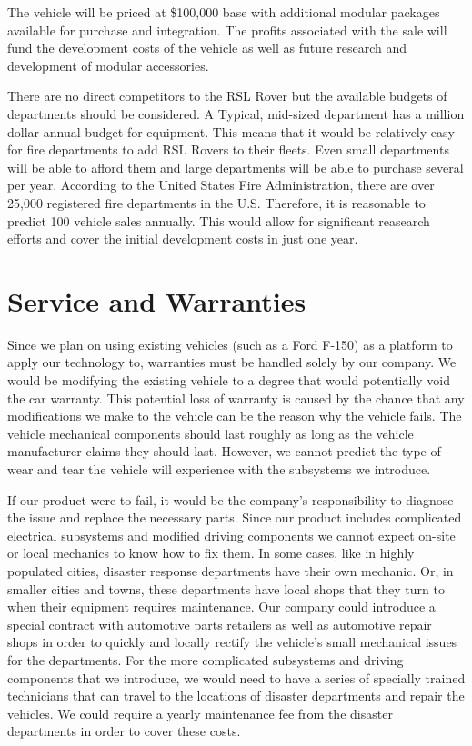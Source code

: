 The vehicle will be priced at \$100,000 base with additional modular packages available for purchase and integration. The profits associated with the sale will fund the development costs of the vehicle as well as future research and development of modular accessories.

There are no direct competitors to the RSL Rover but the available budgets of departments should be considered. A Typical, mid-sized department has a million dollar annual budget for equipment. This means that it would be relatively easy for fire departments to add RSL Rovers to their fleets. Even small departments will be able to afford them and large departments will be able to purchase several per year. According to the United States Fire Administration, there are over 25,000 registered fire departments in the U.S. Therefore, it is reasonable to predict 100 vehicle sales annually. This would allow for significant reasearch efforts and cover the initial development costs in just one year.

\section{Service and Warranties}

Since we plan on using existing vehicles (such as a Ford F-150) as a platform to apply our technology to, warranties must be handled solely by our company. We would be modifying the existing vehicle to a degree that would potentially void the car warranty. This potential loss of warranty is caused by the chance that any modifications we make to the vehicle can be the reason why the vehicle fails. The vehicle mechanical components should last roughly as long as the vehicle manufacturer claims they should last. However, we cannot predict the type of wear and tear the vehicle will experience with the subsystems we introduce. 

If our product were to fail, it would be the company's responsibility to diagnose the issue and replace the necessary parts. Since our product includes complicated electrical subsystems and modified driving components we cannot expect on-site or local mechanics to know how to fix them. In some cases, like in highly populated cities, disaster response departments have their own mechanic. Or, in smaller cities and towns, these departments have local shops that they turn to when their equipment requires maintenance.  Our company could introduce a special contract with automotive parts retailers as well as automotive repair shops in order to quickly and locally rectify the vehicle's small mechanical issues  for the departments. For the more complicated subsystems and driving components that we introduce, we would need to have a series of specially trained technicians that can travel to the locations of disaster departments and repair the vehicles. We could require a yearly maintenance fee from the disaster departments in order to cover these costs. 

